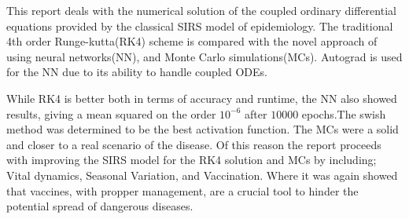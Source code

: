 
This report deals with the numerical solution of the coupled ordinary differential equations provided by the classical SIRS model of epidemiology. The traditional 4th order Runge-kutta(RK4) scheme is compared with the novel approach of using neural networks(NN), and Monte Carlo simulations(MCs). Autograd is used for the NN due to its ability to handle coupled ODEs. 
	
	While RK4 is better both in terms of accuracy and runtime, the NN also showed results, giving a mean squared on the order $10^{-6}$ after $10000$ epochs.The swish method was determined to be the best activation function. The MCs were a solid and closer to a real scenario of the disease. Of this reason the report proceeds with improving the SIRS model for the RK4 solution and MCs by including; Vital dynamics, Seasonal Variation, and Vaccination. Where it was again showed that vaccines, with propper management, are a crucial tool to hinder the potential spread of dangerous diseases.